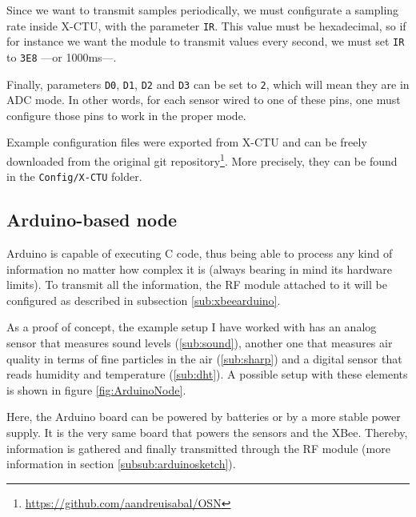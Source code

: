 Since we want to transmit samples periodically, we must configurate a sampling rate inside X-CTU, with the parameter \texttt{IR}. This value must be hexadecimal, so if for instance we want the module to transmit values every second, we must set \texttt{IR} to \texttt{3E8} ---or 1000ms---.

Finally, parameters \texttt{D0}, \texttt{D1}, \texttt{D2} and \texttt{D3} can be set to \texttt{2}, which will mean they are in ADC mode. In other words, for each sensor wired to one of these pins, one must configure those pins to work in the proper mode.

Example configuration files were exported from X-CTU and can be freely downloaded from the original git repository\footnote{\url{https://github.com/aandreuisabal/OSN}}. More precisely, they can be found in the \texttt{Config/X-CTU} folder.

\subsection{Arduino-based node}

Arduino is capable of executing C code, thus being able to process any kind of information no matter how complex it is (always bearing in mind its hardware limits). To transmit all the information, the RF module attached to it will be configured as described in subsection \ref{sub:xbeearduino}.

As a proof of concept, the example setup I have worked with has an analog sensor that measures sound levels (\ref{sub:sound}), another one that measures air quality in terms of fine particles in the air (\ref{sub:sharp}) and a digital sensor that reads humidity and temperature (\ref{sub:dht}). A possible setup with these elements is shown in figure \ref{fig:ArduinoNode}.

Here, the Arduino board can be powered by batteries or by a more stable power supply. It is the very same board that powers the sensors and the XBee\textregistered{}. Thereby, information is gathered and finally transmitted through the RF module (more information in section \ref{subsub:arduinosketch}).

